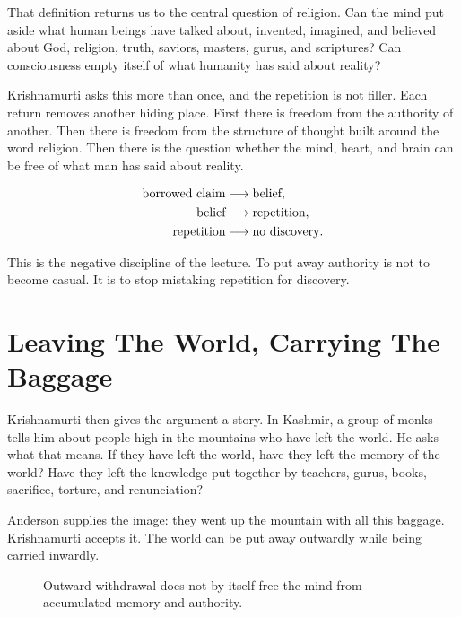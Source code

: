 That definition returns us to the central question of religion. Can the mind put aside what human beings have talked about, invented, imagined, and believed about God, religion, truth, saviors, masters, gurus, and scriptures? Can consciousness empty itself of what humanity has said about reality?

Krishnamurti asks this more than once, and the repetition is not filler. Each return removes another hiding place. First there is freedom from the authority of another. Then there is freedom from the structure of thought built around the word religion. Then there is the question whether the mind, heart, and brain can be free of what man has said about reality.

\begin{align}
\hbox{borrowed claim}
&\longrightarrow \hbox{belief},\\
\hbox{belief}
&\longrightarrow \hbox{repetition},\\
\hbox{repetition}
&\longrightarrow \hbox{no discovery}.
\end{align}

This is the negative discipline of the lecture. To put away authority is not to become casual. It is to stop mistaking repetition for discovery.

\section{Leaving The World, Carrying The Baggage}

Krishnamurti then gives the argument a story. In Kashmir, a group of monks tells him about people high in the mountains who have left the world. He asks what that means. If they have left the world, have they left the memory of the world? Have they left the knowledge put together by teachers, gurus, books, sacrifice, torture, and renunciation?

Anderson supplies the image: they went up the mountain with all this baggage. Krishnamurti accepts it. The world can be put away outwardly while being carried inwardly.

\begin{figure}
\centering
{}
\caption{Outward withdrawal does not by itself free the mind from accumulated memory and authority.}
\end{figure}

